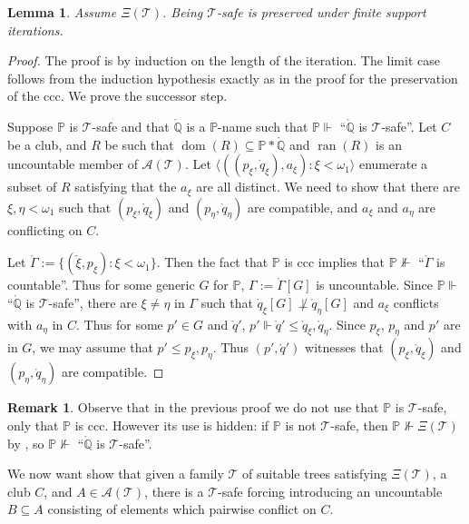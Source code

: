 \documentclass[a4paper,noamsfonts]{amsart}
\newtheorem{lemma}[theorem]{Lemma}
\theoremstyle{definition}
\newtheorem{remark}[theorem]{Remark}
\renewcommand{\P}{\mathbb {P}}
\newcommand{\Q}{\mathbb{Q}}
\newcommand{\seb}{\subseteq}
\newcommand{\tup}[1]{\langle#1\rangle}
\newcommand{\dt}[1]{\mathring{#1}}
\newcommand{\forces}{\Vdash}
\newcommand{\ck}[1]{\check{#1}}
\newcommand{\1}{\mathbbm{1}}
\newcommand{\T}{\mathcal{T}}
\newcommand{\prop}{\Xi}
\DeclareMathOperator{\dom}{dom}
\DeclareMathOperator{\ran}{ran}
\begin{document}
\begin{lemma}\label{lem:safe-iterations}
  Assume $\prop(\T)$.
  Being $\T$-safe is preserved under finite support iterations.
\end{lemma}
\begin{proof}
  The proof is by induction on the length of the iteration.
  The limit case follows from the induction hypothesis exactly as in
  the proof for the preservation of the ccc. We prove the successor step.
  
  Suppose $\P$ is $\T$-safe and that $\dt{\Q}$ is a $\P$-name such that
  $\P \forces$ ``$\dt{\Q}$ is $\T$-safe''. Let
  $C$ be a club, and $R$ be such that $\dom(R) \seb \P*\dt{\Q}$
  and $\ran(R)$ is an uncountable member of $\mathcal{A}(\T)$.
  Let $\tup{((p_{\xi},\dt{q}_{\xi}),a_{\xi} ) : \xi < \omega_{1}}$
  enumerate a subset of $R$ satisfying that the $a_{\xi}$ are all distinct.
  We need to show that there are $\xi,\eta < \omega_{1}$ such that
  $(p_{\xi},\dt{q}_{\xi})$ and $(p_{\eta},\dt{q}_{\eta})$ are compatible,
  and $a_{\xi}$ and $a_{\eta}$ are conflicting on $C$.

  Let
  $\dt{\Gamma} := \{(\ck{\xi},p_{\xi}) : \xi < \omega_{1}\}$. Then
  the fact that $\P$ is ccc implies that $\P \not\forces$ ``$\dt{\Gamma}$
  is countable''. Thus for some  generic $G$ for $\P$,
  $\Gamma := \dt{\Gamma}[G]$ is
  uncountable. Since $\P \forces$ ``$\dt{\Q}$ is $\T$-safe'',
  there are $\xi \neq \eta$ in $\Gamma$
  such that $\dt{q}_{\xi}[G] \not\perp \dt{q}_{\eta}[G]$
  and $a_{\xi}$ conflicts with $a_{\eta}$ in $C$.
  Thus for some  $p' \in G$ and $\dt{q}'$,
  $p' \forces \dt{q}' \le \dt{q}_{\xi},\dt{q}_{\eta}$. Since $p_{\xi}$,
  $p_{\eta}$ and $p'$ are in $G$, we may assume that
  $p' \le p_{\xi},p_{\eta}$. Thus $(p',\dt{q}')$ witnesses that
  $(p_{\xi},\dt{q}_{\xi})$ and $(p_{\eta},\dt{q}_{\eta})$ are compatible.
\end{proof}

\begin{remark}
  Observe that in the previous proof we do not use that $\P$ is
  $\T$-safe, only that $\P$ is ccc. However its use is hidden:
  if $\P$ is not
  $\T$-safe, then $\P \not\forces \prop(\T)$ by
  , so
  $\P \not\forces$ ``$\dt{\Q}$ is $\T$-safe''.
\end{remark}

We now want show that given a family $\T$ of suitable trees
satisfying $\prop(\T)$, a club $C$, and $A \in \mathcal{A}(\T)$, there
is a $\T$-safe forcing introducing an uncountable $B \seb A$
consisting of elements which pairwise conflict on $C$.
\end{document}
